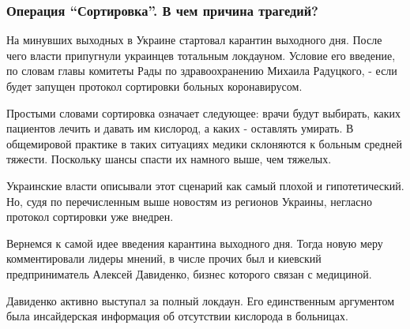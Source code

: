  
 
 
 
 
\subsubsection{Операция \enquote{Сортировка}. В чем причина трагедий?}
\label{sec:18_11_2020.news.ua.strana.romanova_maria.1.draki_kislorod_kovid.operacia_sortirovka}

На минувших выходных в Украине стартовал карантин выходного дня. После чего
власти припугнули украинцев тотальным локдауном. Условие его введение, по
словам главы комитеты Рады по здравоохранению Михаила Радуцкого, - если будет
запущен протокол сортировки больных коронавирусом. 

Простыми словами сортировка означает следующее: врачи будут выбирать, каких
пациентов лечить и давать им кислород, а каких - оставлять умирать. В
общемировой практике в таких ситуациях медики склоняются к больным средней
тяжести. Поскольку шансы спасти их намного выше, чем тяжелых. 

Украинские власти описывали этот сценарий как самый плохой и гипотетический.
Но, судя по перечисленным выше новостям из регионов Украины, негласно протокол
сортировки уже внедрен. 

Вернемся к самой идее введения карантина выходного дня. Тогда новую меру
комментировали лидеры мнений, в числе прочих был и киевский предприниматель
Алексей Давиденко, бизнес которого связан с медициной. 

Давиденко активно выступал за полный локдаун. Его единственным аргументом была
инсайдерская информация об отсутствии кислорода в больницах.

